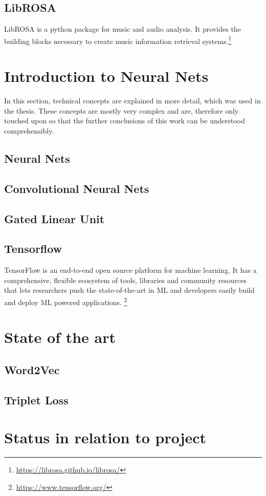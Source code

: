 \subsection{LibROSA}
\label{sub:Librosa}

LibROSA is a python package for music and audio analysis. It provides the building blocks necessary to create music information retrieval systems.\footnote{\url{https://librosa.github.io/librosa/}}

\section{Introduction to Neural Nets}
\label{sec:Intro-NN}

In this section, technical concepts are explained in more detail, which was used in the thesis. These concepts are mostly very complex and are, therefore only touched upon so that the further conclusions of this work can be understood comprehensibly.

\subsection{Neural Nets}
\label{sub:Neural-Nets}

\subsection{Convolutional Neural Nets}
\label{sub:Convolutional-Neural-Nets}

\subsection{Gated Linear Unit}
\label{sub:Gated-Linear-Unit}

\subsection{Tensorflow}
\label{sub:Tensorflow}

TensorFlow is an end-to-end open source platform for machine learning. It has a comprehensive, flexible ecosystem of tools, libraries and community resources that lets researchers push the state-of-the-art in \gls{ML} and developers easily build and deploy \gls{ML} powered applications. \footnote{\url{https://www.tensorflow.org/}}

\section{State of the art}
\label{sec:State-of-art}

\subsection{Word2Vec}
\label{sub:word2wec}

\subsection{Triplet Loss}
\label{sub:Triplet-Loss}

\section{Status in relation to project}
\label{sec:Status-Relation-Project}
